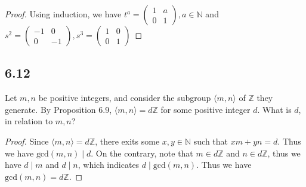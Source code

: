\documentclass[a4paper, pdf, 12pt]{article}
\begin{document}
\begin{proof}
  Using induction, we have 
  $t^{a} = \begin{pmatrix}
    1 & a\\
    0 & 1
  \end{pmatrix}, a\in \mathbb{N}$ and 
  $
  s^{2} = \begin{pmatrix}
    -1 & 0\\
    0 & -1
  \end{pmatrix},
  s^{3} = \begin{pmatrix}
    1 & 0 \\
    0 & 1
  \end{pmatrix}
  $
\end{proof}

\subsection*{6.12}
Let $m, n$ be positive integers, and consider the subgroup $\langle m, n\rangle$ of $\mathbb{Z}$ 
they generate. By Proposition 6.9,
$\langle m, n\rangle = d\mathbb{Z}$
for some positive integer $d$. What is $d$, in relation to $m, n$?

\begin{proof}
  Since $\langle m, n\rangle = d\mathbb{Z}$, there exits some $x, y\in \mathbb{N}$ such that 
  $xm + yn = d$. Thus we have $\mbox{gcd}(m, n) \mid d$. On the contrary, note that $m\in d\mathbb{Z}$ and 
  $n\in d\mathbb{Z}$, thus we have $d\mid m$ and $d\mid n$, which indicates $d\mid \mbox{gcd}(m, n)$. Thus 
  we have $\mbox{gcd}(m, n) = d\mathbb{Z}$.
\end{proof}
\end{document}
